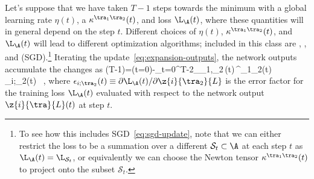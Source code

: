 Let's suppose that we have taken $T-1$ steps towards the minimum with a global learning rate $\eta(t)$, a  $\kappa^{\tra_1\tra_2}(t)$, and loss $\L_{\A}(t)$, where these quantities
will in general depend on the step $t$. Different choices of $\eta(t)$, $\kappa^{\tra_1\tra_2}(t)$, and $\L_{\A}(t)$ will lead to different optimization algorithms; included in this class are , , and  (SGD).\footnote{To see how this includes SGD~\eqref{eq:sgd-update}, note that we can either restrict the loss to be a summation over a different  $\mathcal{S}_t\subset \A$ at each step $t$ as $\L_{\A}(t)= \L_{\mathcal{S}_t}$, or equivalently we can choose the Newton tensor $\kappa^{\tra_1\tra_2}(t)$ to project onto the subset $\mathcal{S}_t$.}
Iterating the update~\eqref{eq:expansion-outputs}, the network outputs accumulate the changes as
\be\label{eq:general-gd-steps}
(T-1)=(t=0)-\sum_{t=0}^{T-2}\sum_{\tra_1,\tra_2}\,\eta(t)\,\kappa^{\tra_1\tra_2}(t) \, \epsilon_{i;\tra_2}(t) \, ,
\ee
where $\epsilon_{i;\tra_2}(t)\equiv\partial \L_{\A}(t)/\partial \z{i}{\tra_2}{L}$ is the error factor for the training loss $\L_{\A}(t)$ evaluated with respect to the network output $\z{i}{\tra}{L}(t)$ at step $t$. 


